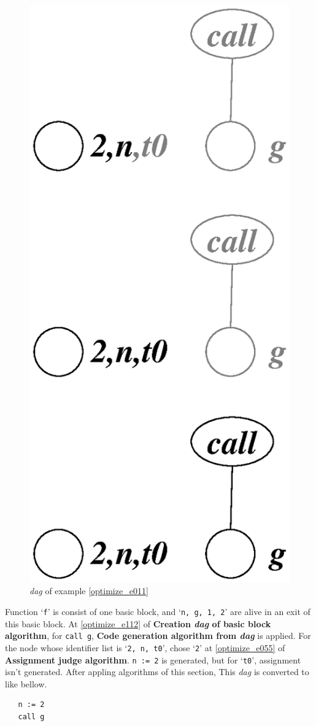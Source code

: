 \begin{Example}
\begin{figure}[htbp]
\begin{center}
\begin{latexonly}
\includegraphics[width=0.530\linewidth,height=1.0\linewidth]{opt003.eps}
\end{latexonly}
\caption{{\em dag} of example \ref{optimize_e011}}
\label{optimize_e012}
\end{center}
\end{figure}
Function `{\tt{f}}' is consist of one basic block, and 
`{\tt{n, g, 1, 2}}' are alive in an exit of this basic block.
At \ref{optimize_e112} of {\bf Creation {\em dag} of basic block algorithm},
for {\tt{call g}},
{\bf Code generation algorithm from {\em dag}} is applied.
For the node whose identifier list is `{\tt{2, n, t0}}',
chose `{\tt{2}}'
at \ref{optimize_e055} of {\bf Assignment judge algorithm}.
{\tt{n := 2}} is generated, but for `{\tt{t0}}', 
assignment isn't generated. 
After appling algorithms of this section,
This {\em dag} is converted to like bellow.
\begin{verbatim}
   n := 2
   call g
\end{verbatim}
\end{Example}

